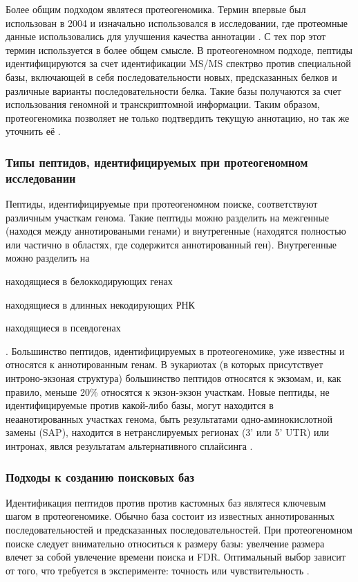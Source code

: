 Более общим подходом являтеся протеогеномика. Термин впервые был использован в 2004 и изначально использовался в исследовании, где протеомные данные использовались для улучшения качества аннотации \cite{jaffe2004proteogenomic}. С тех пор этот термин используется в более общем смысле. В протеогеномном подходе, пептиды идентифицируются за счет идентификации MS/MS спектрво против специальной базы, включающей в себя последовательности новых, предсказанных белков и различные варианты последовательности белка. Такие базы получаются за счет использования геномной и транскриптомной информации. Таким образом, протеогеномика позволяет не только подтвердить текущую аннотацию, но так же уточнить её \cite{nesvizhskii2014proteogenomics}. 

\subsubsection{Типы пептидов, идентифицируемых при протеогеномном исследовании}
Пептиды, идентифицируемые при протеогеномном поиске, соответствуют различным участкам генома. Такие пептиды можно разделить на межгенные (находся между аннотироваными генами) и внутрегенные (находятся полностью или частично в областях, где содержится аннотированный ген). Внутрегенные можно разделить на 
\begin{inparaenum}
    \item находящиеся в белоккодирующих генах 
    \item находящиеся в длинных некодирующих РНК
    \item находящиеся в псевдогенах
\end{inparaenum} \cite{harrow2012gencode}. Большинство пептидов, идентифицируемых в протеогеномике, уже известны и относятся к аннотированным генам. В эукариотах (в которых присутствует интроно-экзоная структура) большинство пептидов относятся к экзомам, и, как правило, меньше 20\% относятся к экзон-экзон участкам. Новые пептиды, не идентифицируемые против какой-либо базы, могут находится в неаанотированных участках генома, быть результатами одно-аминокислотной замены (SAP), находится в нетранслируемых регионах (3' или 5' UTR) или интронах, явлся результатам альтернативного сплайсинга \cite{nesvizhskii2014proteogenomics}.

\subsubsection{Подходы к созданию поисковых баз}
Идентификация пептидов против против кастомных баз являтеся ключевым шагом в протеогеномике. Обычно база состоит из известных аннотированных последовательностей и предсказанных последовательностей. При протеогеномном поиске следует внимательно относиться к размеру базы: увелчение размера влечет за собой увлечение времени поиска и FDR. Оптимальный выбор зависит от того, что требуется в эксперименте: точность или чувствительность \cite{nesvizhskii2014proteogenomics}.

